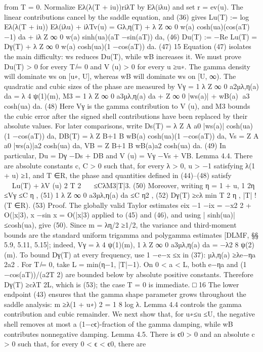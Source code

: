 from T = 0.
Normalize Eλ(λ(T + iu))riλT by Eλ(iλu) and set r = ev(u). The linear contributions cancel
by the saddle equation, and (36) gives
Lu(T) := log Eλ(λ(T + iu))
Eλ(iλu)
+ iλTv(u)
= Gλ,η(T) + λ
Z ∞
0
w(a) cosh(ua)(cos(aT) −1) da
+ iλ
Z ∞
0
w(a) sinh(ua)(aT −sin(aT)) da,
(46)
Du(T) := −Re Lu(T)
= Dγ(T) + λ
Z ∞
0
w(a) cosh(ua)(1 −cos(aT)) da.
(47)
15
Equation (47) isolates the main diﬃculty: ws reduces Du(T), while wB increases it. We must
prove Du(T) > 0 for every T ̸= 0 and V (u) > 0 for every u ≥u∗. The gamma density will
dominate ws on [u∗, U], whereas wB will dominate ws on [U, ∞).
The quadratic and cubic sizes of the phase are measured by
Vγ = 1
λ
Z ∞
0
a2µλ,η(a) da = λ
4 ψ(1)(m),
M3 = 1
λ
Z ∞
0
a3µλ,η(a) da +
Z ∞
0
 |ws(a)| + wB(a)
a3 cosh(ua) da.
(48)
Here Vγ is the gamma contribution to V (u), and M3 bounds the cubic error after the signed
shell contributions have been replaced by their absolute values.
For later comparisons, write
Ds(T) = λ
Z A
a0
|ws(a)| cosh(ua)(1 −cos(aT)) da,
DB(T) = λ
Z B+1
B
wB(a) cosh(ua)(1 −cos(aT)) da,
Vs =
Z A
a0
|ws(a)|a2 cosh(ua) da,
VB =
Z B+1
B
wB(a)a2 cosh(ua) da.
(49)
In particular, Du = Dγ −Ds + DB and V (u) = Vγ −Vs + VB.
Lemma 4.4. There are absolute constants c, C > 0 such that, for every λ > 0, u > −1
satisfying λ(1 + u) ≥1, and T ∈R, the phase and quantities deﬁned in (44)–(48) satisfy
Lu(T) + λV (u)
2
T 2
 ≤CλM3|T|3.
(50)
Moreover, writing η = 1 + u,
1
2η ≤Vγ ≤C
η ,
(51)
1
λ
Z ∞
0
a3µλ,η(a) da ≤C
η2 ,
(52)
Dγ(T) ≥cλ min
T 2
η , |T|
!
(T ∈R).
(53)
Proof. The globally valid Taylor estimates
eix −1 −ix = −x2
2 + O(|x|3),
x −sin x = O(|x|3)
applied to (45) and (46), and using | sinh(ua)| ≤cosh(ua), give (50).
Since m = λη/2 ≥1/2, the variance and third-moment bounds are the standard uniform
trigamma and polygamma estimates [DLMF, §§ 5.9, 5.11, 5.15]; indeed,
Vγ = λ
4 ψ(1)(m),
1
λ
Z ∞
0
a3µλ,η(a) da = −λ2
8 ψ(2)(m).
To bound Dγ(T) at every frequency, use 1 −e−x ≤x in (37):
µλ,η(a) ≥λe−ηa
2a2 .
For T ̸= 0, take L = min(η−1, |T|−1). On 0 < a < L, both e−ηa and (1 −cos(aT))/(a2T 2) are
bounded below by absolute positive constants. Therefore Dγ(T) ≥cλT 2L, which is (53); the
case T = 0 is immediate.
□
16
The lower endpoint (43) ensures that the gamma shape parameter grows throughout the
saddle analysis:
m ≥λ(1 + u∗)
2
= 1
8 log λ.
Lemma 4.4 controls the gamma contribution and cubic remainder. We next show that, for
u∗≤u ≤U, the negative shell removes at most a (1−cϵ)-fraction of the gamma damping, while
wB contributes nonnegative damping.
Lemma 4.5. There is ϵ0 > 0 and an absolute c > 0 such that, for every 0 < ϵ < ϵ0, there are
